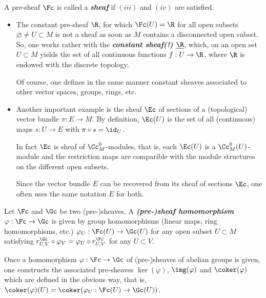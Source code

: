 \begin{defn}
	A pre-sheaf $\Fc$ is called a \textbf{\textit{sheaf}} if $(iii)$ and $(iv)$ are satisfied.
\end{defn}
\begin{example}\leavevmode
	\begin{itemize}
		\item The constant pre-sheaf $\R$, for which $\Fc(U)=\R$ for all open subsets $\varnothing\neq U\subset M$ is not a sheaf as soon as $M$ contains a disconnected open subset. So, one works rather with the \textbf{\textit{constant sheaf(!) $\underline{\R}$}}, which, on an open set $U\subset M$ yields the set of all continuous functions $f:U\to\R$, where $\R$ is endowed with the discrete topology.
	
		Of course, one defines in the same manner constant sheaves associated to other vector spaces, groups, rings, etc.
		\item Another important example is the sheaf $\Ec$ of sections of a (topological) vector bundle $\pi:E\to M$. By definition, $\Ec(U)$ is the set of all (continuous) maps $s:U\to E$ with $\pi\circ s=\id_U$.
		
		In fact $\Ec$ is sheaf of $\Cc_M^0$-modules, that is, each $\Ec(U)$ is a $\Cc_M^0(U)$-module and the restriction maps are comparible with the module structures on the different open subsets.
		
		Since the vector bundle $E$ can be recovered from its sheaf of sections $\Ec$, one often uses the same notation $E$ for both.
	\end{itemize}
\end{example}

\begin{defn}
	Let $\Fc$ and $\Gc$ be two (pre-)sheaves. A \textbf{\textit{(pre-)sheaf homomorphism}} $\varphi:\Fc\to\Gc$ is given by group homomorphisms (linear maps, ring homomorphisms, etc.) $\varphi_U:\Fc(U)\to\Gc(U)$ for any open subset $U\subset M$ satisfying $r_{U,V}^{\Gc}\circ \varphi_V=\varphi_U\circ r_{U,V}^{\Fc}$ for any $U\subset V$.
\end{defn}
Once a homomorphism $\varphi:\Fc\to \Gc$ of (pre-)sheaves of abelian groups is given, one constructs the associated pre-sheaves $\ker(\varphi)$, $\img(\varphi)$ and $\coker(\varphi)$ which are defined in the obvious way, that is, $\coker(\varphi)(U)=\coker(\varphi_U:\Fc(U)\to\Gc(U))$.

